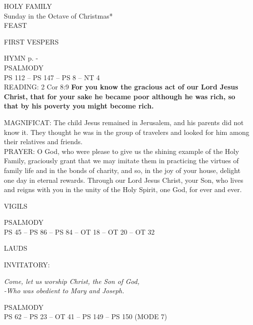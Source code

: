 \begin{center}\normalsize HOLY FAMILY\\
\footnotesize Sunday in the Octave of Christmas*\\
FEAST
\end{center}


\begin{flushleft}\normalsize{\uppercase{FIRST VESPERS\\}}\end{flushleft}
\small{\uppercase{HYMN} p. \pageref{christmas:firstHymn}-\pageref{christmas:lastHymn}\\}
\noindent\small{\uppercase{PSALMODY}\\}
\uppercase{Ps 112 -- Ps 147 -- Ps 8 -- NT 4}\vspace{0.5em}\\

\noindent\small{\uppercase{READING:}}    2 Cor 8:9 \textbf{    For you know the gracious act of our Lord Jesus Christ, that for your sake he became poor although he was rich, so that by his poverty you might become rich. \\}

\noindent\small{\uppercase{MAGNIFICAT:}}	The child Jesus remained in Jerusalem, and his parents did not know it. They thought he was in the group of travelers and looked for him among their relatives and friends.\\

\noindent\small{\uppercase{PRAYER:}}	O God, who were please to give us the shining example of the Holy Family, graciously grant that we may imitate them in practicing the virtues of family life and in the bonds of charity, and so, in the joy of your house, delight one day in eternal rewards. Through our Lord Jesus Christ, your Son, who lives and reigns with you in the unity of the Holy Spirit, one God, for ever and ever.

\begin{flushleft}\normalsize{\uppercase{VIGILS\\}}\end{flushleft}
\noindent\small{\uppercase{PSALMODY}\\}
\uppercase{Ps 45 -- Ps 86 -- Ps 84 -- OT 18 -- OT 20 -- OT 32}\vspace{0.5em}\\

\begin{flushleft}\normalsize{\uppercase{LAUDS\\}}\end{flushleft}
\small{\uppercase{INVITATORY:}}\normalsize
\begin{center}
\textit{Come, let us worship Christ, the Son of God,\\}
\textit{-Who was obedient to Mary and Joseph.\\}
\end{center}
\noindent\small{\uppercase{PSALMODY}\\}
\uppercase{Ps 62 -- Ps 23 -- OT 41 -- Ps 149 -- Ps 150 (mode 7)}\vspace{0.5em}\\

